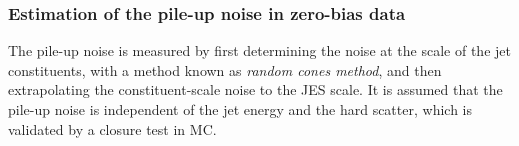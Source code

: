 \subsubsection{Estimation of the pile-up noise in zero-bias data}
\label{subsec:pile-up-noise}
The pile-up noise is measured by first determining the noise at the scale of the jet constituents, with a method known as \emph{random cones method}, and then extrapolating the constituent-scale noise to the JES scale. It is assumed that the pile-up noise is independent of the jet energy and the hard scatter, which is validated by a closure test in MC.



